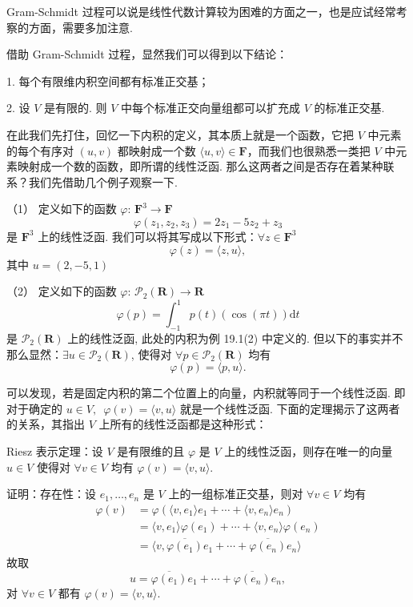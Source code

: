 Gram-Schmidt 过程可以说是线性代数计算较为困难的方面之一，也是应试经常考察的方面，需要多加注意. 

借助 Gram-Schmidt 过程，显然我们可以得到以下结论：

1. 每个有限维内积空间都有标准正交基；

2. 设 $ V $ 是有限的. 则 $ V $ 中每个标准正交向量组都可以扩充成 $ V $ 的标准正交基.

\vspace{2ex}

在此我们先打住，回忆一下内积的定义，其本质上就是一个函数，它把 $ V $ 中元素的每个有序对 $(u, v)$ 都映射成一个数 
$ \langle u, v \rangle \in \mathbf{F}$，而我们也很熟悉一类把 $ V $ 中元素映射成一个数的函数，即所谓的线性泛函. 
那么这两者之间是否存在着某种联系？我们先借助几个例子观察一下. 

\begin{example}
    \textup{（1）} 定义如下的函数 $\varphi$: $\mathbf{F}^{3} \rightarrow \mathbf{F}$
    \[\varphi(z_1, z_2, z_3) = 2z_1 - 5z_2 + z_3\]
    是 $\mathbf{F}^{3}$ 上的线性泛函. 我们可以将其写成以下形式：$ \forall z \in \mathbf{F}^{3}$
    \[\varphi(z) = \langle z, u\rangle,\]
    其中 $u = (2, -5, 1)$

    \textup{（2）} 定义如下的函数 $\varphi$: $\mathcal{P}_2(\mathbf{R}) \rightarrow \mathbf{R}$
    \[\varphi(p) = \int_{-1}^1 p(t)(\cos(\pi t))\mathrm{d}t\]
    是 $\mathcal{P}_2(\mathbf{R})$ 上的线性泛函, 此处的内积为例 19.1(2) 中定义的.
    但以下的事实并不那么显然：$\exists u \in \mathcal{P}_2(\mathbf{R})$, 使得对 
    $\forall p \in \mathcal{P}_2(\mathbf{R})$ 均有
    \[\varphi (p) = \langle p, u\rangle. \]
\end{example}

可以发现，若是固定内积的第二个位置上的向量，内积就等同于一个线性泛函. 即对于确定的 $ u \in V , \enspace \varphi(v) = \langle v, u \rangle$ 就是一个线性泛函. 
下面的定理揭示了这两者的关系，其指出 $ V $ 上所有的线性泛函都是这种形式：
\begin{theorem}
    Riesz 表示定理：设 $ V $ 是有限维的且 $ \varphi $ 是 $ V $ 上的线性泛函，则存在唯一的向量
    $u \in V$ 使得对 $\forall v \in V$ 均有 $ \varphi(v) = \langle v, u\rangle $.
\end{theorem}

证明：存在性：设 $e_1, \ldots , e_n$ 是 $ V $ 上的一组标准正交基，则对 $\forall v \in V $ 均有
\begin{align*}
    \varphi (v) & = \varphi(\langle v, e_1 \rangle e_1 + \cdots + \langle v, e_n \rangle e_n ) \\
                & = \langle v, e_1 \rangle \varphi (e_1) + \cdots + \langle v, e_n \rangle \varphi (e_n) \\
                & = \langle v, \overline{\varphi(e_1)}e_1 + \cdots + \overline{\varphi(e_n)}e_n \rangle
\end{align*}
故取
\[ u = \overline{\varphi(e_1)}e_1 + \cdots + \overline{\varphi(e_n)}e_n, \]
对 $\forall v \in V$ 都有 $\varphi(v) = \langle v, u \rangle .$

